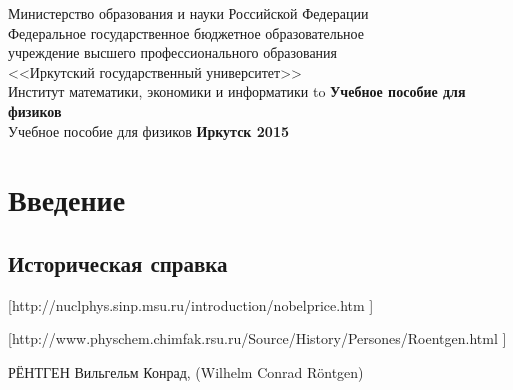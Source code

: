 \documentclass[a4paper,14pt, openany, twoside, draft]{extbook} %
\newcommand{\aaa}[2][acolor]{\noindent\textcolor{eclr}%
{+\ [}\textcolor{#1}{#2}\textcolor{eclr}{]}}
\begin{document}

\renewcommand{\refname}{Список использованных источников} %
\renewcommand{\bibname}{\refname}
\begin{titlepage}
\thispagestyle{empty}
\begin{center}{\small{}
Министерство образования и науки
Российской Федерации\\
Федеральное государственное бюджетное образовательное\\
учреждение высшего профессионального образования\\
<<Иркутский государственный университет>> \\
Институт математики, экономики и информатики
}
\vfill
\hbox to \linewidth{\hfill\bfseries А.~Л.~Финкельштейн, Т.~Ю.~Черкашина\hfill}
 \vspace{2em}
{\large\bfseries Учебное пособие для физиков}\\
\vspace{1em}
{Учебное пособие для физиков}
\vfill
\vfill
 \textbf{Иркутск 2015}
\end{center}
\end{titlepage}

\clearpage
\tableofcontents
\clearpage

\chapter*{Введение}
\label{cha:intro}

\section*{Историческая справка}
\label{sec:history}


[http://nuclphys.sinp.msu.ru/introduction/nobelprice.htm ]

[http://www.physchem.chimfak.rsu.ru/Source/History/Persones/Roentgen.html ]

РЁНТГЕН Вильгельм Конрад, (Wilhelm Conrad Röntgen)
\end{document}
